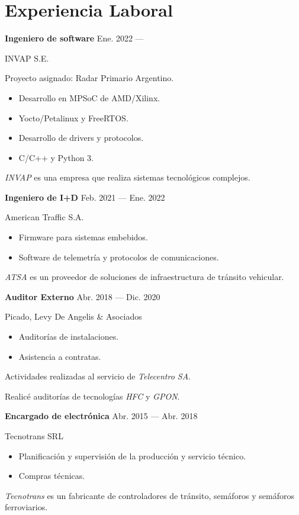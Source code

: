 \section{Experiencia Laboral}


\parbox[t][][t]{\linewidth}{
	\parbox{\linewidth}{
		\textbf{Ingeniero de software}
			\hfill
			{Ene. 2022 --- \phantom{Dic. 2099}}
		}
	\smallbreak
	\parbox{\linewidth}{INVAP S.E.}
	\smallbreak
	Proyecto asignado: Radar Primario Argentino.
	\begin{itemize}
	    \item{Desarrollo en MPSoC de AMD/Xilinx.}
		\item{Yocto/Petalinux y FreeRTOS.}
		\item{Desarrollo de drivers y protocolos.}
		\item{C/C++ y Python 3.}
	\end{itemize}
	\smallbreak
    \emph{INVAP} es una empresa que realiza sistemas tecnológicos complejos.
}

\bigskip
\parbox[t][][t]{\linewidth}{
	\parbox{\linewidth}{
		\textbf{Ingeniero de I+D}
			\hfill
			{Feb. 2021 --- Ene. 2022}
		}
	\smallbreak
	\parbox{\linewidth}{American Traffic S.A.}
	\smallbreak
	\begin{itemize}
	    \item{Firmware para sistemas embebidos.}
	    \item{Software de telemetría y protocolos de comunicaciones.}
	\end{itemize}
	\smallbreak
    \emph{ATSA} es un proveedor de soluciones de infraestructura de tránsito vehicular.
}

\bigskip
\parbox[t][][t]{\linewidth}{
	\parbox{\linewidth}{
		\textbf{Auditor Externo}
			\hfill
			{Abr. 2018 --- Dic. 2020}
		}
	\smallbreak
	\parbox{\linewidth}{Picado, Levy De Angelis \& Asociados}
	\smallbreak
	\begin{itemize}
	    \item{Auditorías de instalaciones.}
	    \item{Asistencia a contratas.}
	\end{itemize}
	\smallbreak
	Actividades realizadas al servicio de \emph{Telecentro SA}.

    Realicé auditorías de tecnologías \emph{HFC} y \emph{GPON}.
}

\bigskip
\parbox[t][][t]{\linewidth}{
	{\parbox{\linewidth}{
		\parbox{\linewidth}{
			\textbf{Encargado de electrónica}
			\hfill
			{Abr. 2015 --- Abr. 2018}
		}
	}}
	\smallbreak
	\parbox{\linewidth}{Tecnotrans SRL}
	\smallbreak
	\begin{itemize}
	    \item{Planificación y supervisión de la producción y servicio técnico.}
	    \item{Compras técnicas.}
	\end{itemize}
	\smallbreak
	\emph{Tecnotrans} es un fabricante de controladores de tránsito, semáforos y semáforos ferroviarios.
}

